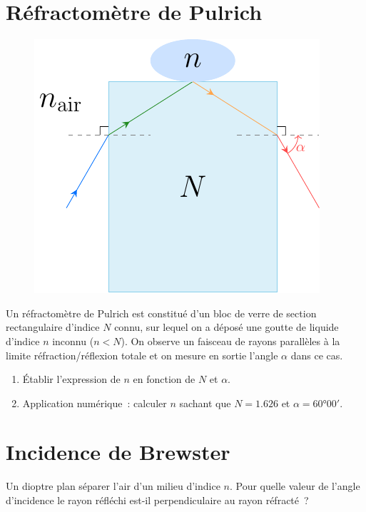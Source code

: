\documentclass[../../main/main.tex]{subfiles}
\begin{document}
\section{Réfractomètre de Pulrich}
\begin{figure}
	\vspace*{-20pt}
	\centering
	\includegraphics[width=\linewidth]{pulrich_plain}
	\label{fig:pulrich_plain}
\end{figure}

Un réfractomètre de Pulrich est constitué d'un bloc de verre de section
rectangulaire d'indice $N$ connu, sur lequel on a déposé une goutte de liquide
d'indice $n$ inconnu ($n < N$). On observe un faisceau de rayons parallèles à la
limite réfraction/réflexion totale et on mesure en sortie l'angle $\alpha$ dans
ce cas.
\begin{enumerate}
	\item Établir l'expression de $n$ en fonction de $N$ et $\alpha$.
	\item Application numérique~: calculer $n$ sachant que $N = \num{1.626}$ et
	      $\alpha = \ang{60;00;}$.
\end{enumerate}

\section{Incidence de Brewster}
Un dioptre plan séparer l'air d'un milieu d'indice $n$. Pour quelle valeur de
l'angle d'incidence le rayon réfléchi est-il perpendiculaire au rayon réfracté~?
\end{document}
